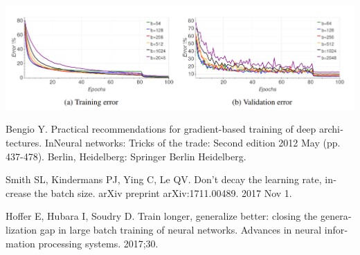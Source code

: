 \begin{enumerate}
	\begin{center}
		\includegraphics*[width=1\linewidth]{pics/img9.png}
		\label{تاثیر اندازه دسته در سرعت همگرایی تست شبکه ۲}
	\end{center}
	
	
	
	
	\begin{latin}
		\begin{thebibliography}{9}
			Bengio Y. Practical recommendations for gradient-based training of deep architectures. InNeural networks: Tricks of the trade: Second edition 2012 May (pp. 437-478). Berlin, Heidelberg: Springer Berlin Heidelberg.
			
			
			Smith SL, Kindermans PJ, Ying C, Le QV. Don't decay the learning rate, increase the batch size. arXiv preprint arXiv:1711.00489. 2017 Nov 1.
			
			Hoffer E, Hubara I, Soudry D. Train longer, generalize better: closing the generalization gap in large batch training of neural networks. Advances in neural information processing systems. 2017;30.
			
		\end{thebibliography} 
	\end{latin}
\end{enumerate}
















